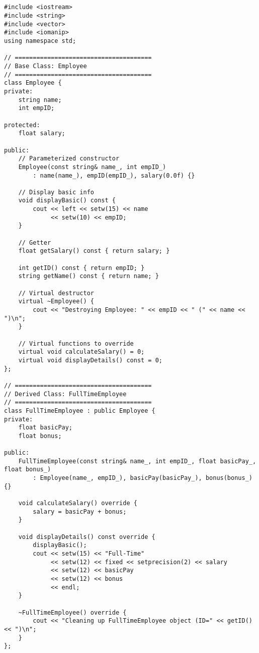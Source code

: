 \documentclass[12pt,a4paper]{article}
\begin{document}
\subsection{}
\begin{lstlisting}
#include <iostream>
#include <string>
#include <vector>
#include <iomanip>
using namespace std;

// ======================================
// Base Class: Employee
// ======================================
class Employee {
private:
    string name;
    int empID;

protected:
    float salary;

public:
    // Parameterized constructor
    Employee(const string& name_, int empID_)
        : name(name_), empID(empID_), salary(0.0f) {}

    // Display basic info
    void displayBasic() const {
        cout << left << setw(15) << name
             << setw(10) << empID;
    }

    // Getter
    float getSalary() const { return salary; }

    int getID() const { return empID; }
    string getName() const { return name; }

    // Virtual destructor
    virtual ~Employee() {
        cout << "Destroying Employee: " << empID << " (" << name << ")\n";
    }

    // Virtual functions to override
    virtual void calculateSalary() = 0;
    virtual void displayDetails() const = 0;
};

// ======================================
// Derived Class: FullTimeEmployee
// ======================================
class FullTimeEmployee : public Employee {
private:
    float basicPay;
    float bonus;

public:
    FullTimeEmployee(const string& name_, int empID_, float basicPay_, float bonus_)
        : Employee(name_, empID_), basicPay(basicPay_), bonus(bonus_) {}

    void calculateSalary() override {
        salary = basicPay + bonus;
    }

    void displayDetails() const override {
        displayBasic();
        cout << setw(15) << "Full-Time"
             << setw(12) << fixed << setprecision(2) << salary
             << setw(12) << basicPay
             << setw(12) << bonus
             << endl;
    }

    ~FullTimeEmployee() override {
        cout << "Cleaning up FullTimeEmployee object (ID=" << getID() << ")\n";
    }
};


\end{lstlisting}
\end{document}
